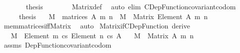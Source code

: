 \begin{isabellebody}
\ \ \ \ \isamarkupfalse%
\ \isamarkupfalse%
\ {\isacharquery}{\kern0pt}thesis\isanewline
\ \ \ \ \ \ \isamarkupfalse%
\ Matrix{\isacharunderscore}{\kern0pt}def\ \isamarkupfalse%
\ {\isacharparenleft}{\kern0pt}auto\ elim{\isacharcolon}{\kern0pt}\ CDep{\isacharunderscore}{\kern0pt}Function{\isacharunderscore}{\kern0pt}covariant{\isacharunderscore}{\kern0pt}codom{\isacharparenright}{\kern0pt}\isanewline
\ \ \isamarkupfalse%
\isanewline
\ \ \isamarkupfalse%
\ \isamarkupfalse%
\ {\isacharquery}{\kern0pt}thesis\ \isacommand{{\isachardot}{\kern0pt}}\isamarkupfalse%
\isanewline
{}\isamarkupfalse%
%
\endisatagproof
{\isafoldproof}%
%
\isadelimproof
\isanewline
%
\endisadelimproof
\isanewline
{}\isamarkupfalse%
\isanewline
\ \ {\isachardoublequoteopen}M\ {\isasymin}\ matrices\ A\ m\ n{\isachardoublequoteclose}\ {\isasymrightleftharpoons}\ {\isachardoublequoteopen}M\ {\isacharcolon}{\kern0pt}\ Matrix\ {\isacharparenleft}{\kern0pt}Element\ A{\isacharparenright}{\kern0pt}\ m\ n{\isachardoublequoteclose}\isanewline
%
\isadelimproof
\ \ %
\endisadelimproof
%
\isatagproof
{}\isamarkupfalse%
\ mem{\isacharunderscore}{\kern0pt}matrices{\isacharunderscore}{\kern0pt}iff{\isacharunderscore}{\kern0pt}Matrix\ \isamarkupfalse%
\ auto%
\endisatagproof
{\isafoldproof}%
%
\isadelimproof
\isanewline
%
\endisadelimproof
\isanewline
{}\isamarkupfalse%
\ Matrix{\isacharunderscore}{\kern0pt}if{\isacharunderscore}{\kern0pt}CDep{\isacharunderscore}{\kern0pt}Function\ {\isacharbrackleft}{\kern0pt}derive{\isacharbrackright}{\kern0pt}{\isacharcolon}{\kern0pt}\isanewline
\ \ \ {\isachardoublequoteopen}M\ {\isacharcolon}{\kern0pt}\ Element\ {\isacharbrackleft}{\kern0pt}{}{\isacharcomma}{\kern0pt}{\isasymdots}{\isacharcomma}{\kern0pt}m{\isacharbrackleft}{\kern0pt}\ {\isasymrightarrow}cs\ Element\ {\isacharbrackleft}{\kern0pt}{}{\isacharcomma}{\kern0pt}{\isasymdots}{\isacharcomma}{\kern0pt}n{\isacharbrackleft}{\kern0pt}\ {\isasymrightarrow}cs\ A{\isachardoublequoteclose}\isanewline
\ \ \ {\isachardoublequoteopen}M\ {\isacharcolon}{\kern0pt}\ Matrix\ A\ m\ n{\isachardoublequoteclose}\isanewline
%
\isadelimproof
\ \ %
\endisadelimproof
%
\isatagproof
{}\isamarkupfalse%
\ assms\ Dep{\isacharunderscore}{\kern0pt}Function{\isacharunderscore}{\kern0pt}covariant{\isacharunderscore}{\kern0pt}codom\ \isamarkupfalse%

\end{isabellebody}
